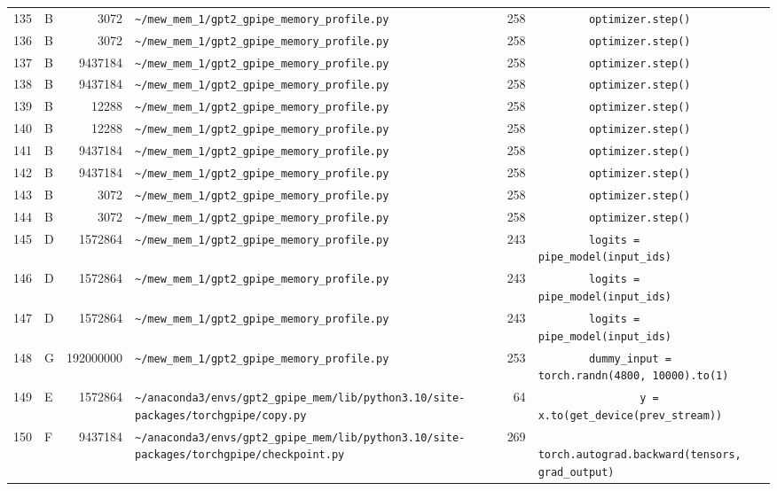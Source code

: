 \documentclass{article}
\begin{document}
\begin{longtable}{r l r p{6.5cm} r p{7.0cm}}
135 & B & 3072 & \lstinline|~/mew_mem_1/gpt2_gpipe_memory_profile.py| & 258 & \lstinline|        optimizer.step()| \\
136 & B & 3072 & \lstinline|~/mew_mem_1/gpt2_gpipe_memory_profile.py| & 258 & \lstinline|        optimizer.step()| \\
137 & B & 9437184 & \lstinline|~/mew_mem_1/gpt2_gpipe_memory_profile.py| & 258 & \lstinline|        optimizer.step()| \\
138 & B & 9437184 & \lstinline|~/mew_mem_1/gpt2_gpipe_memory_profile.py| & 258 & \lstinline|        optimizer.step()| \\
139 & B & 12288 & \lstinline|~/mew_mem_1/gpt2_gpipe_memory_profile.py| & 258 & \lstinline|        optimizer.step()| \\
140 & B & 12288 & \lstinline|~/mew_mem_1/gpt2_gpipe_memory_profile.py| & 258 & \lstinline|        optimizer.step()| \\
141 & B & 9437184 & \lstinline|~/mew_mem_1/gpt2_gpipe_memory_profile.py| & 258 & \lstinline|        optimizer.step()| \\
142 & B & 9437184 & \lstinline|~/mew_mem_1/gpt2_gpipe_memory_profile.py| & 258 & \lstinline|        optimizer.step()| \\
143 & B & 3072 & \lstinline|~/mew_mem_1/gpt2_gpipe_memory_profile.py| & 258 & \lstinline|        optimizer.step()| \\
144 & B & 3072 & \lstinline|~/mew_mem_1/gpt2_gpipe_memory_profile.py| & 258 & \lstinline|        optimizer.step()| \\
145 & D & 1572864 & \lstinline|~/mew_mem_1/gpt2_gpipe_memory_profile.py| & 243 & \lstinline|        logits = pipe_model(input_ids)| \\
146 & D & 1572864 & \lstinline|~/mew_mem_1/gpt2_gpipe_memory_profile.py| & 243 & \lstinline|        logits = pipe_model(input_ids)| \\
147 & D & 1572864 & \lstinline|~/mew_mem_1/gpt2_gpipe_memory_profile.py| & 243 & \lstinline|        logits = pipe_model(input_ids)| \\
148 & G & 192000000 & \lstinline|~/mew_mem_1/gpt2_gpipe_memory_profile.py| & 253 & \lstinline|        dummy_input = torch.randn(4800, 10000).to(1)| \\
149 & E & 1572864 & \lstinline|~/anaconda3/envs/gpt2_gpipe_mem/lib/python3.10/site-packages/torchgpipe/copy.py| & 64 & \lstinline|                y = x.to(get_device(prev_stream))| \\
150 & F & 9437184 & \lstinline|~/anaconda3/envs/gpt2_gpipe_mem/lib/python3.10/site-packages/torchgpipe/checkpoint.py| & 269 & \lstinline|            torch.autograd.backward(tensors, grad_output)| \\

\end{longtable}
\end{document}
